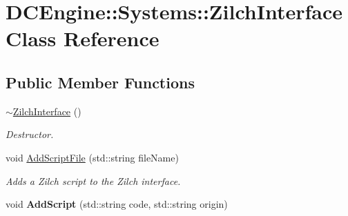 \hypertarget{classDCEngine_1_1Systems_1_1ZilchInterface}{\section{D\-C\-Engine\-:\-:Systems\-:\-:Zilch\-Interface Class Reference}
\label{classDCEngine_1_1Systems_1_1ZilchInterface}
}
\subsection*{Public Member Functions}
\begin{DoxyCompactItemize}
\item 
\hypertarget{classDCEngine_1_1Systems_1_1ZilchInterface_ae7e9d4d1c2b2d8936c57637db64eef5c}{\hyperlink{classDCEngine_1_1Systems_1_1ZilchInterface_ae7e9d4d1c2b2d8936c57637db64eef5c}{$\sim$\-Zilch\-Interface} ()}\label{classDCEngine_1_1Systems_1_1ZilchInterface_ae7e9d4d1c2b2d8936c57637db64eef5c}

\begin{DoxyCompactList}\small\item\em Destructor. \end{DoxyCompactList}\item 
void \hyperlink{classDCEngine_1_1Systems_1_1ZilchInterface_abd2d3363810d7e81b5b9180d9b6bbb57}{Add\-Script\-File} (std\-::string file\-Name)
\begin{DoxyCompactList}\small\item\em Adds a Zilch script to the Zilch interface. \end{DoxyCompactList}\item 
\hypertarget{classDCEngine_1_1Systems_1_1ZilchInterface_a9aa2aecd29d915d0f1c59128eefb5797}{void {\bfseries Add\-Script} (std\-::string code, std\-::string origin)}\label{classDCEngine_1_1Systems_1_1ZilchInterface_a9aa2aecd29d915d0f1c59128eefb5797}


\end{DoxyCompactItemize}
